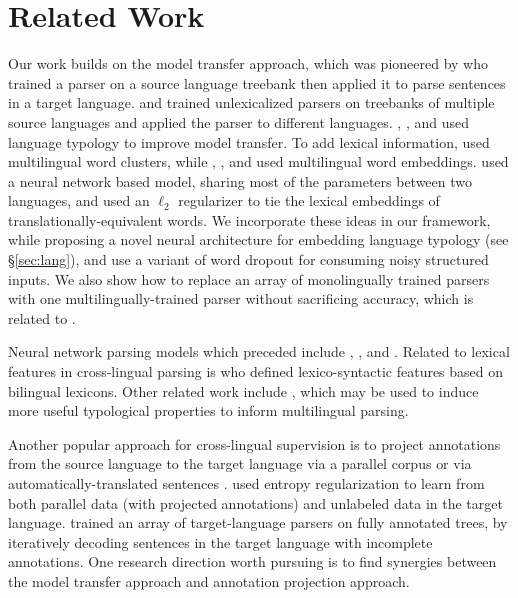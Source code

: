 \documentclass[11pt]{article}
\begin{document}
\section{Related Work}
\label{sec:related}
Our work builds on the model transfer approach, which was pioneered by  who trained a parser on a source language treebank then applied it to parse sentences in a target language.
 and  trained unlexicalized parsers on treebanks of multiple source languages and applied the parser to different languages.
, , and  used language typology to improve model transfer.
To add lexical information,  used multilingual word clusters, while , ,  and  used multilingual word embeddings.
 used a neural network based model, sharing most of the parameters between two languages, and used an $\ell_2$ regularizer to tie the lexical embeddings of translationally-equivalent words.
We incorporate these ideas in our framework, while proposing a novel neural architecture for embedding language typology (see \S\ref{sec:lang}), and use a variant of word dropout \cite{iyyer:15} for consuming noisy structured inputs.
We also show how to replace an array of monolingually trained parsers with one multilingually-trained parser without sacrificing accuracy, which is related to .

Neural network parsing models which preceded  include , ,  and .
Related to lexical features in cross-lingual parsing is  who defined lexico-syntactic features based on bilingual lexicons.
Other related work include , which may be used to induce more useful typological properties to inform multilingual parsing.

Another popular approach for cross-lingual supervision is to project annotations from the source language to the target language via a parallel corpus \cite{yarowsky:01,hwa:05} or via automatically-translated sentences \cite{tiedemann:14b}. 
 used entropy regularization to learn from both parallel data (with projected annotations) and unlabeled data in the target language.
 trained an array of target-language parsers on fully annotated trees, by iteratively decoding sentences in the target language with incomplete annotations. 
One research direction worth pursuing is to find synergies between the model transfer approach and annotation projection approach.
\end{document}

